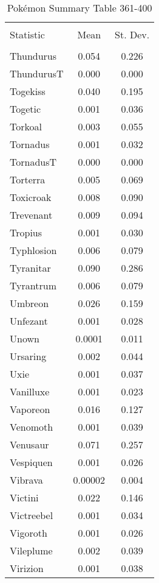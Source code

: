 \documentclass[12pt,twoside]{reedthesis}
\begin{document}
  \begin{table}[!htbp] \centering 
    \caption{Pokémon Summary Table 361-400} 
    \label{} 
  \begin{tabular}{@{\extracolsep{5pt}}lcc} 
  \\[-1.8ex]\hline 
  \hline \\[-1.8ex] 
  Statistic & \multicolumn{1}{c}{Mean} & \multicolumn{1}{c}{St. Dev.} \\ 
  \hline \\[-1.8ex] 
  Thundurus & 0.054 & 0.226 \\ 
  ThundurusT & 0.000 & 0.000 \\ 
  Togekiss & 0.040 & 0.195 \\ 
  Togetic & 0.001 & 0.036 \\ 
  Torkoal & 0.003 & 0.055 \\ 
  Tornadus & 0.001 & 0.032 \\ 
  TornadusT & 0.000 & 0.000 \\ 
  Torterra & 0.005 & 0.069 \\ 
  Toxicroak & 0.008 & 0.090 \\ 
  Trevenant & 0.009 & 0.094 \\ 
  Tropius & 0.001 & 0.030 \\ 
  Typhlosion & 0.006 & 0.079 \\ 
  Tyranitar & 0.090 & 0.286 \\ 
  Tyrantrum & 0.006 & 0.079 \\ 
  Umbreon & 0.026 & 0.159 \\ 
  Unfezant & 0.001 & 0.028 \\ 
  Unown & 0.0001 & 0.011 \\ 
  Ursaring & 0.002 & 0.044 \\ 
  Uxie & 0.001 & 0.037 \\ 
  Vanilluxe & 0.001 & 0.023 \\ 
  Vaporeon & 0.016 & 0.127 \\ 
  Venomoth & 0.001 & 0.039 \\ 
  Venusaur & 0.071 & 0.257 \\ 
  Vespiquen & 0.001 & 0.026 \\ 
  Vibrava & 0.00002 & 0.004 \\ 
  Victini & 0.022 & 0.146 \\ 
  Victreebel & 0.001 & 0.034 \\ 
  Vigoroth & 0.001 & 0.026 \\ 
  Vileplume & 0.002 & 0.039 \\ 
  Virizion & 0.001 & 0.038 \\ 

\end{tabular}
\end{table}
\end{document}
